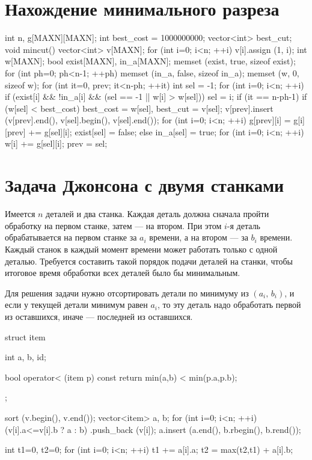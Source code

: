\documentclass[12pt, titlepage]{article}
\begin{document}
\section{Нахождение минимального разреза}
\begin{cppcode}
int n, g[MAXN][MAXN];
int best_cost = 1000000000;
vector<int> best_cut;
 void mincut() {
    vector<int> v[MAXN];
    for (int i=0; i<n; ++i)
        v[i].assign (1, i);
    int w[MAXN];
    bool exist[MAXN], in_a[MAXN];
    memset (exist, true, sizeof exist);
    for (int ph=0; ph<n-1; ++ph) {
        memset (in_a, false, sizeof in_a);
        memset (w, 0, sizeof w);
        for (int it=0, prev; it<n-ph; ++it) {
            int sel = -1;
            for (int i=0; i<n; ++i)
                if (exist[i] && !in_a[i] && (sel == -1 || w[i] > w[sel]))
                    sel = i;
            if (it == n-ph-1) {
                if (w[sel] < best_cost)
                    best_cost = w[sel],  best_cut = v[sel];
                v[prev].insert (v[prev].end(), v[sel].begin(), v[sel].end());
                for (int i=0; i<n; ++i)
                    g[prev][i] = g[i][prev] += g[sel][i];
                exist[sel] = false;
            }
            else {
                in_a[sel] = true;
                for (int i=0; i<n; ++i)
                    w[i] += g[sel][i];
                prev = sel;
            }
        }
    }
}
\end{cppcode}


\section{Задача Джонсона с двумя станками}

Имеется $n$ деталей и два станка. Каждая деталь должна сначала пройти обработку на первом станке, затем — на втором. При этом $i$-я деталь обрабатывается на первом станке за $a_i$ времени, а на втором — за $b_i$ времени. Каждый станок в каждый момент времени может работать только с одной деталью. Требуется составить такой порядок подачи деталей на станки, чтобы итоговое время обработки всех деталей было бы минимальным.

Для решения задачи нужно отсортировать детали по минимуму из $(a_i,\,b_i)$, и если у текущей детали минимум равен $a_i$, то эту деталь надо обработать первой из оставшихся, иначе — последней из оставшихся.

\begin{cppcode}
struct item {
    int a, b, id;
 
    bool operator< (item p) const {
        return min(a,b) < min(p.a,p.b);
    }
};
 
 
sort (v.begin(), v.end());
vector<item> a, b;
for (int i=0; i<n; ++i)
    (v[i].a<=v[i].b ? a : b) .push_back (v[i]);
a.insert (a.end(), b.rbegin(), b.rend());
 
int t1=0, t2=0;
for (int i=0; i<n; ++i) {
    t1 += a[i].a;
    t2 = max(t2,t1) + a[i].b;
}
\end{cppcode}
\end{document}
